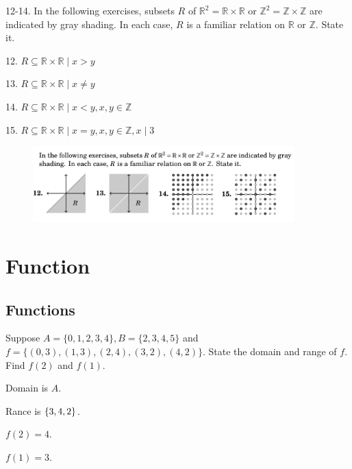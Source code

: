 \documentclass[openany, 12pt]{book}
\begin{document}
\begin{exercise}{}{}
	12-14. In the following exercises, subsets $R$ of $\mathbb{R}^2=\mathbb{R}
		\times \mathbb{R}$ or $\mathbb{Z}^2=\mathbb{Z} \times \mathbb{Z}$ are
	indicated by gray shading. In each case, $R$ is a familiar relation on
	$\mathbb{R}$ or $\mathbb{Z}$. State it.
	\begin{alist}
		\item 12. $R\subseteq \mathbb{R}\times\mathbb{R}\mid {x>y}$
		\item 13. $R\subseteq \mathbb{R}\times\mathbb{R}\mid {x\neq y}$
		\item 14. $R\subseteq \mathbb{R}\times\mathbb{R}\mid {x<y, x,y\in\mathbb{Z}}$
		\item 15. $R\subseteq \mathbb{R}\times\mathbb{R}\mid {x=y, x,y\in\mathbb{Z},
				x\mid 3}$
	\end{alist}
\end{exercise}
\begin{figure}
	\centering
	\includegraphics[width=0.9\textwidth]{images/11-01-12.png}
\end{figure}






\chapter{Function}
\section{Functions}
\begin{exercise}{}{}
	Suppose $A=\{0,1,2,3,4\}, B=\{2,3,4,5\}$ and\\
	$f=\{(0,3),(1,3),(2,4),(3,2),(4,2)\}$. State the domain and range of $f$.
	Find $f(2)$ and $f(1)$.
	\tcblower
	\begin{alist}
		\item Domain is $A$.
		\item Rance is $\{3, 4, 2\}$.
		\item $f(2) = 4$.
		\item $f(1) = 3$.
	\end{alist}
\end{exercise}
\end{document}
